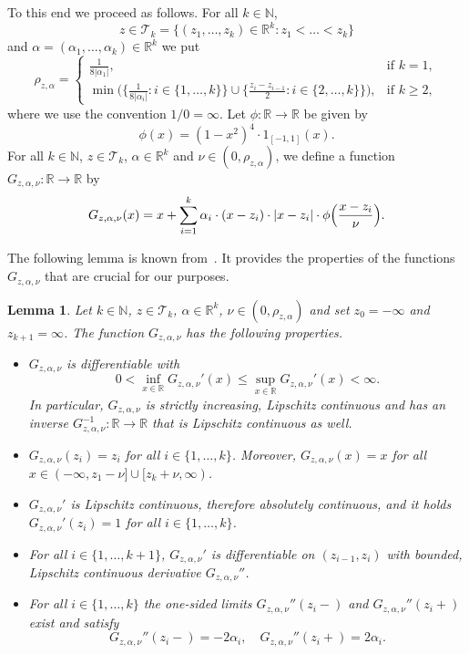 \documentclass[11pt]{amsart}
\newcommand{\R}{{\mathbb R}}
\newcommand{\N}{{\mathbb N}}
\newcommand{\Tm}{{\mathcal T}}
\newcommand{\ind}{1}
\theoremstyle{plain}
\newtheorem{lemma}{Lemma}
\theoremstyle{definition}
\begin{document}
To this end we proceed as follows. For all $k\in\N$,
\[
z\in\Tm_k=\{(z_1,\dots,z_k)\in\R^k\colon z_1<\dots<z_k\}
\]
 and $\alpha=(\alpha_1,\dots,\alpha_k)\in\R^k$ we put
\[
\rho_{z,\alpha} =  \begin{cases}
\frac{1}{8 |\alpha_1|}, & \text{if }k=1, \\
\min\bigl(\bigl\{\frac{1}{8 |\alpha_i|}\colon i\in \{1, \ldots, k\}\bigr\} \cup \bigl\{ \frac{z_i-z_{i-1}}{2}\colon i\in \{2, \ldots, k\}\bigr\}\bigr),& \text{if }k\geq 2,
\end{cases}
\]
where we use the convention $1/0 =\infty$. Let $\phi\colon\R\to\R$ be given by
\begin{equation}\label{phi}
\phi(x)=(1-x^2)^4\cdot \ind_{[-1, 1]}(x).
\end{equation}
For all $k\in\N$, $z\in \Tm_k$, $\alpha\in\R^k$ and $\nu\in (0,\rho_{z,\alpha})$, we define a function $G_{z,\alpha,\nu}\colon\R\to\R$ by
\begin{equation}\label{fct1}
G_{z,\alpha,\nu}(x) = x+\sum_{i=1}^k \alpha_i\cdot (x-z_i)\cdot |x-z_i|\cdot \phi \Bigl(\frac{x-z_i}{\nu}\Bigr).
\end{equation}





The following lemma
is known from~\cite{MGY19b}.
It provides the properties of the functions $G_{z,\alpha,\nu}$ that are crucial for our purposes.

\begin{lemma}\label{lemx1}
Let $k\in\N$, $z\in \Tm_k$, $\alpha\in\R^k$, $\nu\in (0,\rho_{z,\alpha})$ and set $z_0=-\infty$ and $z_{k+1}= \infty$. The function $G_{z,\alpha,\nu}$ has the following properties.
\begin{itemize}
\item[(i)] $G_{z,\alpha,\nu}$ is differentiable with
\[
0<\inf_{x\in\R} G_{z,\alpha,\nu}'(x)\leq \sup_{x\in\R} G_{z,\alpha,\nu}'(x)<\infty.
\]
In particular,  $G_{z,\alpha,\nu}$ is strictly increasing,  Lipschitz continuous and has an inverse $G_{z,\alpha,\nu}^{-1}\colon\R\to\R$ that is Lipschitz continuous as well.
\item[(ii)] $G_{z,\alpha,\nu}(z_i)=z_i$ for all $i\in\{1, \ldots, k\}$. Moreover, $G_{z,\alpha,\nu}(x) = x$ for all $x\in(-\infty, z_1-\nu]\cup [z_k+\nu, \infty)$.
\item[(iii)]  $G_{z,\alpha,\nu}'$ is Lipschitz continuous, therefore absolutely continuous,
and it holds $G_{z,\alpha,\nu}'(z_i) = 1$ for all $i\in\{1,\dots,k\}$.
\item[(iv)] For all $i\in\{1,\dots,k+1\}$,  $G_{z,\alpha,\nu}'$ is differentiable on $(z_{i-1},z_i)$ with bounded, Lipschitz continuous derivative $G_{z,\alpha,\nu}''$.
\item[(v)] For all $i\in\{1,\dots,k\}$ the one-sided limits  $G_{z,\alpha,\nu}''(z_i-) $ and $G_{z,\alpha,\nu}''(z_i+)$ exist and satisfy
\[
G_{z,\alpha,\nu}''(z_i-) = -2\alpha_i,\quad G_{z,\alpha,\nu}''(z_i+) = 2\alpha_i.
\]
\end{itemize}
\end{lemma}
\end{document}
